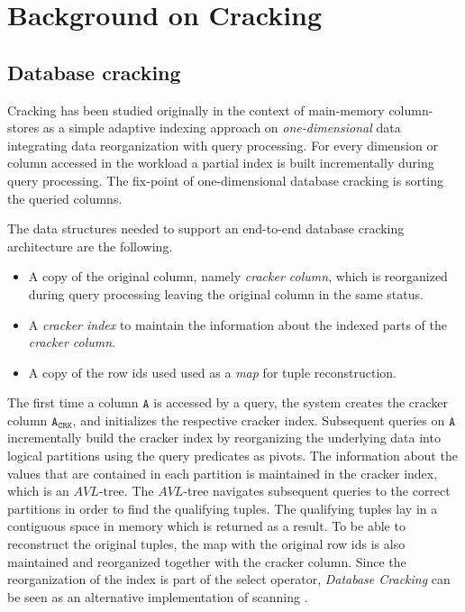 \section{Background on Cracking}
\label{sec:background}


\subsection{Database cracking}
Cracking has been studied originally in the context of main-memory
column-stores as a simple adaptive indexing approach on \emph{one-dimensional}
data \cite{DBLP:conf/cidr/IdreosKM07} integrating data reorganization with query processing. 
For every dimension or column accessed in the workload a partial index is 
built incrementally during query processing.
The fix-point of one-dimensional database cracking is sorting the queried columns.


The data structures needed to support an end-to-end database 
cracking architecture are the following.
\begin{itemize}
\item A copy of the original column, namely \emph{cracker column}, which is
reorganized during query processing leaving the original column in the same
status.
\item A \emph{cracker index} to maintain the information about the indexed 
parts of the \emph{cracker column}.
\item A copy of the row ids used used as a \emph{map} for tuple reconstruction.
\end{itemize}

The first time a column $\mathtt{A}$ is accessed by a query, the system 
creates the cracker column $\mathtt{A_{CRK}}$,
and initializes the respective cracker index. Subsequent queries on
$\mathtt{A}$ incrementally build the cracker index by
reorganizing the underlying data into logical partitions using the query
predicates as pivots. The information about the values that are contained in
each partition is maintained in the cracker index, which is an $AVL$-tree. The
$AVL$-tree navigates subsequent queries to the correct partitions in order to
find the qualifying tuples. The qualifying tuples lay in a contiguous space in
memory which is returned as a result. To be able to reconstruct the original
tuples, the map with the original row ids is also maintained and reorganized
together with the cracker column.
Since the reorganization of the index is part of the select
operator, \emph{Database Cracking} can be seen as an alternative
implementation of scanning \cite{efficient_cracking}. 



